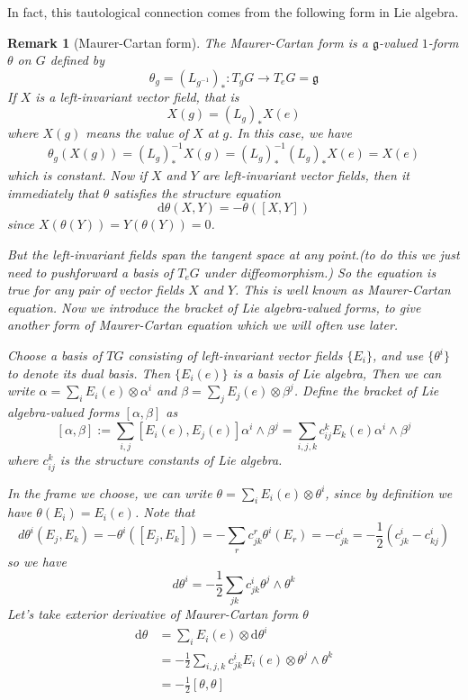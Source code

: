 \documentclass[11pt]{amsart}
\numberwithin{equation}{section}
\theoremstyle{plain}
\theoremstyle{plain}
\newtheorem{remksub}[thmsub]{Remark}
\numberwithin{equation}{section}
\begin{document}
In fact, this tautological connection comes from the following form in Lie algebra.
\begin{remksub}[Maurer-Cartan form]\normalfont
The Maurer-Cartan form is a $\mathfrak{g}$-valued $1$-form $\theta$ on $G$ defined by
$$
\theta_g=(L_{g^{-1}})_*:T_gG\to T_eG=\mathfrak{g}
$$
If $X$ is a left-invariant vector field, that is 
$$
X(g)=(L_g)_*X(e)
$$
where $X(g)$ means the value of $X$ at $g$. In this case, we have
$$
\theta_g(X(g))=(L_g)_*^{-1}X(g)=(L_g)_*^{-1}(L_g)_*X(e)=X(e)
$$
which is constant. Now if $X$ and $Y$ are left-invariant vector fields, then it immediately that $\theta$ satisfies the structure equation
$$
\mathrm{d}\theta(X,Y)=-\theta([X,Y])
$$
since $X(\theta(Y))=Y(\theta(Y))=0$. 

But the left-invariant fields span the tangent space at any point.(to do this we just need to pushforward a basis of $T_eG$ under diffeomorphism.) So the equation is true for any pair of vector fields $X$ and $Y$. This is well known as Maurer-Cartan equation. Now we introduce the bracket of Lie algebra-valued forms, to give another form of Maurer-Cartan equation which we will often use later.

Choose a basis of $TG$ consisting of left-invariant vector fields $\{E_i\}$, and use $\{\theta^i\}$ to denote its dual basis. Then $\{E_i(e)\}$ is a basis of Lie algebra,  Then we can write $\alpha=\sum_iE_i(e)\otimes\alpha^i$ and $\beta=\sum_jE_j(e)\otimes\beta^j$. Define the bracket of Lie algebra-valued forms ${[\alpha,\beta]}$ as 
$$
{[\alpha,\beta]}:=\sum_{i,j}[E_i(e),E_j(e)]\alpha^i\wedge\beta^j=\sum_{i,j,k}c_{ij}^kE_k(e)\alpha^i\wedge\beta^j
$$
where $c_{ij}^k$ is the structure constants of Lie algebra.

In the frame we choose, we can write $\theta=\sum_iE_i(e)\otimes\theta^i$, since by definition we have $\theta(E_i)=E_i(e)$. Note that
$$
d \theta^{i}\left(E_{j}, E_{k}\right)=-\theta^{i}\left(\left[E_{j}, E_{k}\right]\right)=-\sum_{r} c_{j k}^{r} \theta^{i}\left(E_{r}\right)=-c_{j k}^{i}=-\frac{1}{2}\left(c_{j k}^{i}-c_{k j}^{i}\right)
$$
so we have
$$
d \theta^{i}=-\frac{1}{2} \sum_{j k} c_{j k}^{i} \theta^{j} \wedge \theta^{k}
$$
Let's take exterior derivative of Maurer-Cartan form $\theta$
$$
\begin{aligned}
\mathrm{d}\theta&=\sum_iE_i(e)\otimes\mathrm{d}\theta^i\\
&=-\frac12\sum_{i,j,k}c^i_{jk}E_i(e)\otimes\theta^j\wedge\theta^k\\
&=-\frac12[\theta,\theta]
\end{aligned}
$$


\end{remksub}
\end{document}
